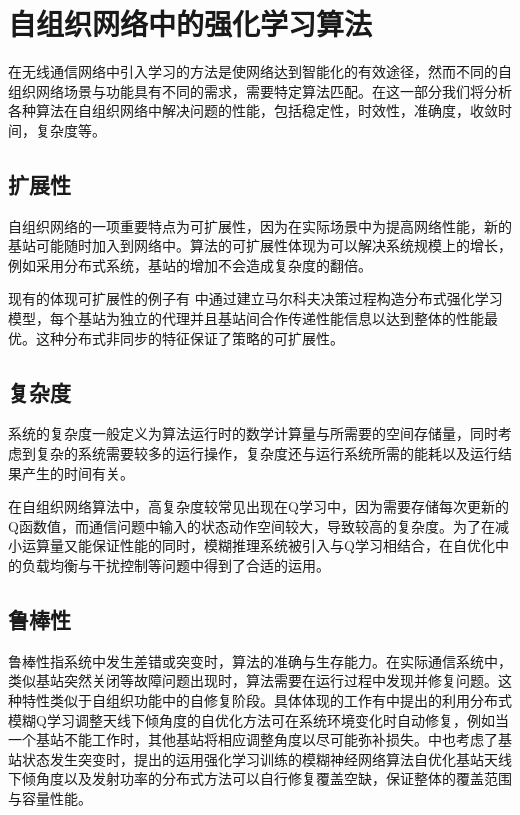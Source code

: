 ﻿\documentclass[11pt,draftclsnofoot,onecolumn,journal,letterpaper]{IEEEtran}
\begin{document}
\section{自组织网络中的强化学习算法}
\label{sec:Compare}
在无线通信网络中引入学习的方法是使网络达到智能化的有效途径，然而不同的自组织网络场景与功能具有不同的需求，需要特定算法匹配。在这一部分我们将分析各种算法在自组织网络中解决问题的性能，包括稳定性，时效性，准确度，收敛时间，复杂度等。
\subsection{扩展性}
自组织网络的一项重要特点为可扩展性，因为在实际场景中为提高网络性能，新的基站可能随时加入到网络中。算法的可扩展性体现为可以解决系统规模上的增长，例如采用分布式系统，基站的增加不会造成复杂度的翻倍。

现有的体现可扩展性的例子有\cite{Dirani2010} 中通过建立马尔科夫决策过程构造分布式强化学习模型，每个基站为独立的代理并且基站间合作传递性能信息以达到整体的性能最优。这种分布式非同步的特征保证了策略的可扩展性。

\subsection{复杂度}
系统的复杂度一般定义为算法运行时的数学计算量与所需要的空间存储量，同时考虑到复杂的系统需要较多的运行操作，复杂度还与运行系统所需的能耗以及运行结果产生的时间有关。

在自组织网络算法中，高复杂度较常见出现在Q学习中，因为需要存储每次更新的Q函数值，而通信问题中输入的状态动作空间较大，导致较高的复杂度。为了在减小运算量又能保证性能的同时，模糊推理系统被引入与Q学习相结合，在自优化中的负载均衡与干扰控制等问题中得到了合适的运用。
\subsection{鲁棒性}
鲁棒性指系统中发生差错或突变时，算法的准确与生存能力。在实际通信系统中，类似基站突然关闭等故障问题出现时，算法需要在运行过程中发现并修复问题。这种特性类似于自组织功能中的自修复阶段。具体体现的工作有\cite{Razavi2010}中提出的利用分布式模糊Q学习调整天线下倾角度的自优化方法可在系统环境变化时自动修复，例如当一个基站不能工作时，其他基站将相应调整角度以尽可能弥补损失。\cite{Fan2014}中也考虑了基站状态发生突变时，提出的运用强化学习训练的模糊神经网络算法自优化基站天线下倾角度以及发射功率的分布式方法可以自行修复覆盖空缺，保证整体的覆盖范围与容量性能。
\end{document}
